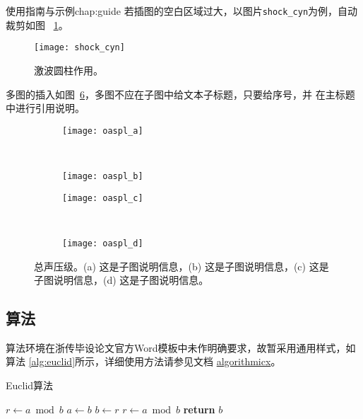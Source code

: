 \begin{cuzchapter}{使用指南与示例}{chap:guide}
    若插图的空白区域过大，以图片\verb|shock_cyn|为例，自动裁剪如图
    ~\ref{fig:shock_cyn}。
    \begin{figure}[h]
        \centering
        \texttt{[image: shock\_cyn]}
        \caption[激波圆柱作用]{激波圆柱作用。}
        \label{fig:shock_cyn}
    \end{figure}

    多图的插入如图~\ref{fig:oaspl}，多图不应在子图中给文本子标题，只要给序号，并
    在主标题中进行引用说明。
    \begin{figure}[h]
        \centering
        \begin{subfigure}[b]{0.35\textwidth}
            \texttt{[image: oaspl\_a]}
            \caption{}
            \label{fig:oaspl_a}
        \end{subfigure}%
        ~%
        \begin{subfigure}[b]{0.35\textwidth}
            \texttt{[image: oaspl\_b]}
            \caption{}
            \label{fig:oaspl_b}
        \end{subfigure}
        \begin{subfigure}[b]{0.35\textwidth}
            \texttt{[image: oaspl\_c]}
            \caption{}
            \label{fig:oaspl_c}
        \end{subfigure}%
        ~%
        \begin{subfigure}[b]{0.35\textwidth}
            \texttt{[image: oaspl\_d]}
            \caption{}
            \label{fig:oaspl_d}
        \end{subfigure}
        \caption[总声压级]{总声压级。(a) 这是子图说明信息，(b) 这是子图说明信息，(c) 这是子图说明信息，(d) 这是子图说明信息。}
        \label{fig:oaspl}
    \end{figure}

    \subsection{算法}\label{sub:algorithms}

    算法环境在浙传毕设论文官方Word模板中未作明确要求，故暂采用通用样式，如算法
    \ref{alg:euclid}所示，详细使用方法请参见文档
    \href{https://ctan.org/pkg/algorithmicx?lang=en}{algorithmicx}。

    \begin{algorithm}[h]
        \small
        \caption{Euclid算法}\label{alg:euclid}
        \begin{algorithmic}[1]
            \State $r\gets a\bmod b$
            \State $a\gets b$
            \State $b\gets r$
            \State $r\gets a\bmod b$
            \EndWhile\label{euclidendwhile}
            \State \textbf{return} $b$
            \EndProcedure
        \end{algorithmic}
    \end{algorithm}


\end{cuzchapter}
